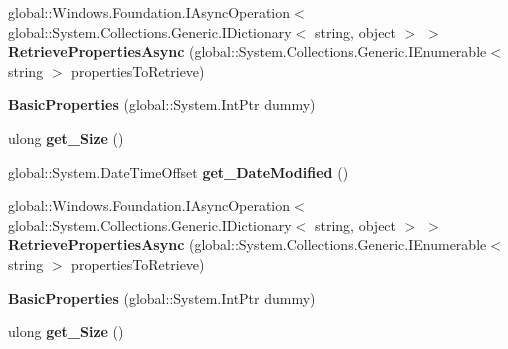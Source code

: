 \begin{DoxyCompactItemize}
global\+::\+Windows.\+Foundation.\+I\+Async\+Operation$<$ global\+::\+System.\+Collections.\+Generic.\+I\+Dictionary$<$ string, object $>$ $>$ {\bfseries Retrieve\+Properties\+Async} (global\+::\+System.\+Collections.\+Generic.\+I\+Enumerable$<$ string $>$ properties\+To\+Retrieve)
\item 
\mbox{\label{class_windows_1_1_storage_1_1_file_properties_1_1_basic_properties_a1e59bb5e98b3bdb808833a68eab07f9e}} 
{\bfseries Basic\+Properties} (global\+::\+System.\+Int\+Ptr dummy)
\item 
\mbox{\label{class_windows_1_1_storage_1_1_file_properties_1_1_basic_properties_a990d0f7166669cc5c3a28b4c051a5f29}} 
ulong {\bfseries get\+\_\+\+Size} ()
\item 
\mbox{\label{class_windows_1_1_storage_1_1_file_properties_1_1_basic_properties_a32ef3325f757258938c74274c8d9a2ad}} 
global\+::\+System.\+Date\+Time\+Offset {\bfseries get\+\_\+\+Date\+Modified} ()
\item 
\mbox{\label{class_windows_1_1_storage_1_1_file_properties_1_1_basic_properties_a0e64ae79604ba053bcdbe1e537e3f2a7}} 
global\+::\+Windows.\+Foundation.\+I\+Async\+Operation$<$ global\+::\+System.\+Collections.\+Generic.\+I\+Dictionary$<$ string, object $>$ $>$ {\bfseries Retrieve\+Properties\+Async} (global\+::\+System.\+Collections.\+Generic.\+I\+Enumerable$<$ string $>$ properties\+To\+Retrieve)
\item 
\mbox{\label{class_windows_1_1_storage_1_1_file_properties_1_1_basic_properties_a1e59bb5e98b3bdb808833a68eab07f9e}} 
{\bfseries Basic\+Properties} (global\+::\+System.\+Int\+Ptr dummy)
\item 
\mbox{\label{class_windows_1_1_storage_1_1_file_properties_1_1_basic_properties_a990d0f7166669cc5c3a28b4c051a5f29}} 
ulong {\bfseries get\+\_\+\+Size} ()
\item 
\mbox{\label{class_windows_1_1_storage_1_1_file_properties_1_1_basic_properties_a32ef3325f757258938c74274c8d9a2ad}} 

\end{DoxyCompactItemize}
